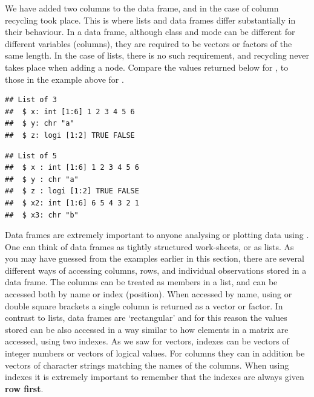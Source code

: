 \documentclass[krantz2]{krantz}\usepackage{knitr}%
\begin{document}
We have added two columns to the data frame, and in the case of column  recycling took place. This is where lists and data frames differ substantially in their behaviour. In a data frame, although class and mode can be different for different variables (columns), they are required to be vectors or factors of the same length. In the case of lists, there is no such requirement, and recycling never takes place when adding a node. Compare the values returned below for , to those in the example above for .

\begin{knitrout}\footnotesize
{}\color{fgcolor}\begin{kframe}
\begin{alltt}
 \hlkwb{<-} \hlstd{(} \hlstd{=} \hlopt{:}\hlstd{,}  \hlstd{=} \hlstd{,}  \hlstd{=} \hlstd{(}\hlstd{,} \hlstd{))}
\end{alltt}
\begin{verbatim}
## List of 3
##  $ x: int [1:6] 1 2 3 4 5 6
##  $ y: chr "a"
##  $ z: logi [1:2] TRUE FALSE
\end{verbatim}
\begin{alltt}
\hlopt{$} \hlkwb{<-} \hlopt{:}
\hlopt{$} \hlkwb{<-} 
\end{alltt}
\begin{verbatim}
## List of 5
##  $ x : int [1:6] 1 2 3 4 5 6
##  $ y : chr "a"
##  $ z : logi [1:2] TRUE FALSE
##  $ x2: int [1:6] 6 5 4 3 2 1
##  $ x3: chr "b"
\end{verbatim}
\end{kframe}
\end{knitrout}

Data frames are extremely important to anyone analysing or plotting data using \Rlang. One can think of data frames as tightly structured work-sheets, or as lists. As you may have guessed from the examples earlier in this section, there are several different ways of accessing columns, rows, and individual observations stored in a data frame. The columns can be treated as members in a list, and can be accessed both by name or index (position). When accessed by name, using \Roperator{\$} or double square brackets a single column is returned as a vector or factor. In contrast to lists, data frames are `rectangular' and for this reason the values stored can be also accessed in a way similar to how elements in a matrix are accessed, using two indexes. As we saw for vectors, indexes can be vectors of integer numbers or vectors of logical values. For columns they can in addition be vectors of character strings matching the names of the columns. When using indexes it is extremely important to remember that the indexes are always given \textbf{row first}.
\end{document}
